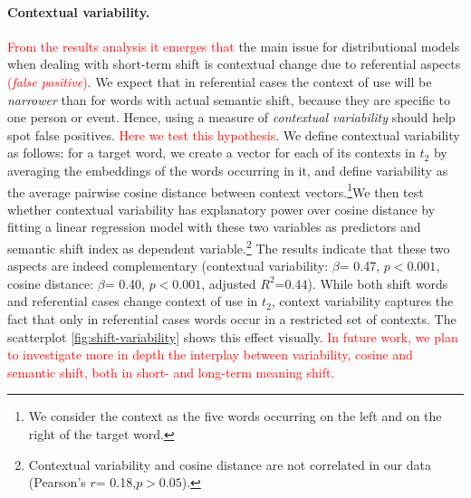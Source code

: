 \paragraph{Contextual variability.}


\textcolor{red}{From the results analysis it emerges that} the main issue for distributional models when dealing
with short-term shift is contextual change due to referential aspects \textcolor{red}{(\textit{false positive})}.
We expect that in referential cases the context of use will be \textit{narrower} than for words with actual semantic shift, because they are specific to one person or event. Hence, using a measure of \textit{contextual variability} should help spot false positives. \textcolor{red}{Here we test this hypothesis}. 
We define contextual variability as follows: for a target word, we create a vector for each of its contexts in $t_2$ by averaging the embeddings of the words  occurring in it, and define variability as the average pairwise cosine distance between context vectors.\footnote{We consider the context as the five words occurring on the left and on the right of the target word.}We then test whether contextual variability has explanatory power over cosine distance by fitting a linear regression model with these two variables as predictors and semantic shift index as dependent variable.\footnote{Contextual variability and cosine distance are not correlated in our data (Pearson's $r$= 0.18,$p> 0.05$). }
The results indicate that these two aspects are indeed complementary (contextual variability: $\beta$= 0.47, $p< 0.001$, cosine distance: $\beta$= 0.40, $p< 0.001$, adjusted $R^2$=0.44). While both shift words and referential cases change context of use in $t_2$, context variability captures the fact that only in referential cases words occur in a restricted set of contexts. The scatterplot \ref{fig:shift-variability} shows this effect visually. \textcolor{red}{In future work, we plan to investigate more in depth the interplay between variability, cosine and semantic shift, both in short- and long-term meaning shift.}

